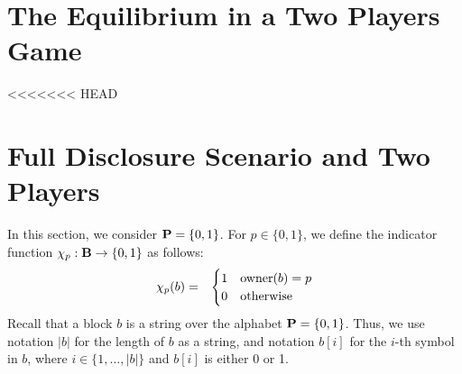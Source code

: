 
\section{The Equilibrium in a Two Players Game}
\label{sec-twoplayers}

<<<<<<< HEAD
\section{Full Disclosure Scenario and Two Players}
\label{sec-fd&2p}
In this section, we consider $\mathbf{P} = \{0,1\}$. For $p \in \{0,1\}$, we define the indicator  function $\chi_p : \mathbf{B} \to \{0,1\}$ as follows:
\begin{eqnarray*}
\chi_p(b) & = & 
\begin{cases}
1 & \text{\rm owner}(b) = p\\
0 & \text{otherwise}
\end{cases}
\end{eqnarray*}
Recall that a block $b$ is a string over the alphabet $\mathbf{P} = \{0,1\}$. Thus, we use notation $|b|$ for the length of $b$ as a string, and notation $b[i]$ for the $i$-th symbol in $b$, where $i \in \{1, \ldots, |b|\}$ and $b[i]$ is either 0 or 1. 

 
